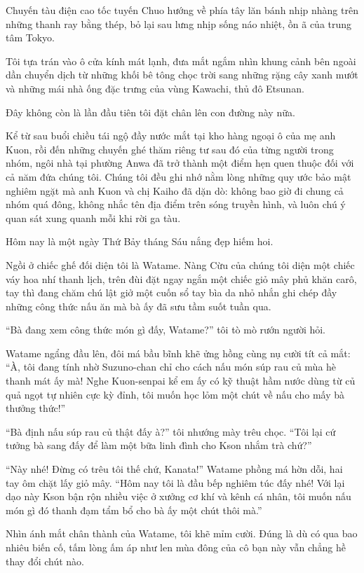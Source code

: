 \documentclass[../main.tex]{subfiles}
\begin{document}

Chuyến tàu điện cao tốc tuyến Chuo hướng về phía tây lăn bánh nhịp nhàng trên những thanh ray bằng thép, bỏ lại sau lưng nhịp sống náo nhiệt, ồn ã của trung tâm Tokyo.

Tôi tựa trán vào ô cửa kính mát lạnh, đưa mắt ngắm nhìn khung cảnh bên ngoài dần chuyển dịch từ những khối bê tông chọc trời sang những rặng cây xanh mướt và những mái nhà ống đặc trưng của vùng Kawachi, thủ đô Etsunan.

Đây không còn là lần đầu tiên tôi đặt chân lên con đường này nữa.

Kể từ sau buổi chiều tái ngộ đầy nước mắt tại kho hàng ngoại ô của mẹ anh Kuon, rồi đến những chuyến ghé thăm riêng tư sau đó của từng người trong nhóm, ngôi nhà tại phường Anwa đã trở thành một điểm hẹn quen thuộc đối với cả năm đứa chúng tôi. Chúng tôi đều ghi nhớ nằm lòng những quy ước bảo mật nghiêm ngặt mà anh Kuon và chị Kaiho đã dặn dò: không bao giờ đi chung cả nhóm quá đông, không nhắc tên địa điểm trên sóng truyền hình, và luôn chú ý quan sát xung quanh mỗi khi rời ga tàu.

Hôm nay là một ngày Thứ Bảy tháng Sáu nắng đẹp hiếm hoi.

Ngồi ở chiếc ghế đối diện tôi là Watame. Nàng Cừu của chúng tôi diện một chiếc váy hoa nhí thanh lịch, trên đùi đặt ngay ngắn một chiếc giỏ mây phủ khăn carô, tay thì đang chăm chú lật giở một cuốn sổ tay bìa da nhỏ nhắn ghi chép đầy những công thức nấu ăn mà bà ấy đã sưu tầm suốt tuần qua.

``Bà đang xem công thức món gì đấy, Watame?'' tôi tò mò rướn người hỏi.

Watame ngẩng đầu lên, đôi má bầu bĩnh khẽ ửng hồng cùng nụ cười tít cả mắt: ``À, tôi đang tính nhờ Suzuno-chan chỉ cho cách nấu món súp rau củ mùa hè thanh mát ấy mà! Nghe Kuon-senpai kể em ấy có kỹ thuật hầm nước dùng từ củ quả ngọt tự nhiên cực kỳ đỉnh, tôi muốn học lỏm một chút về nấu cho mấy bà thưởng thức!''

``Bà định nấu súp rau củ thật đấy à?'' tôi nhướng mày trêu chọc. ``Tôi lại cứ tưởng bà sang đấy để làm một bữa linh đình cho Kson nhắm trà chứ?''

``Này nhé! Đừng có trêu tôi thế chứ, Kanata!'' Watame phồng má hờn dỗi, hai tay ôm chặt lấy giỏ mây. ``Hôm nay tôi là đầu bếp nghiêm túc đấy nhé! Với lại dạo này Kson bận rộn nhiều việc ở xưởng cơ khí và kênh cá nhân, tôi muốn nấu món gì đó thanh đạm tẩm bổ cho bà ấy một chút thôi mà.''

Nhìn ánh mắt chân thành của Watame, tôi khẽ mỉm cười. Đúng là dù có qua bao nhiêu biến cố, tấm lòng ấm áp như len mùa đông của cô bạn này vẫn chẳng hề thay đổi chút nào.
\end{document}
